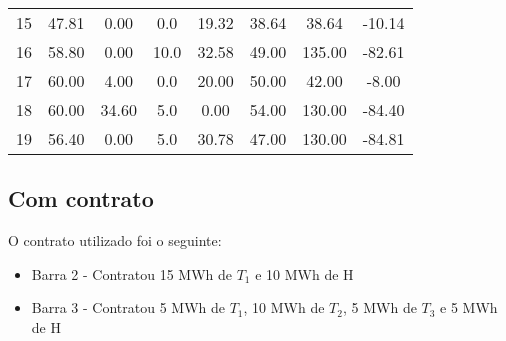 \documentclass[a4paper,12pt,twoside]{article}
\begin{document}
\begin{center}
\begin{tabular}{ c c c c c c c c }
        15   & 47.81     & 0.00      & 0.0  & 19.32   & 38.64   & 38.64  & -10.14 \\
        16   & 58.80     & 0.00     & 10.0  & 32.58   & 49.00  & 135.00  & -82.61 \\
        17   & 60.00     & 4.00      & 0.0  & 20.00   & 50.00   & 42.00   & -8.00 \\
        18   & 60.00    & 34.60      & 5.0   & 0.00   & 54.00  & 130.00  & -84.40 \\
        19   & 56.40     & 0.00      & 5.0  & 30.78   & 47.00  & 130.00  & -84.81
    \end{tabular}
\end{center}

\subsection{Com contrato}
O contrato utilizado foi o seguinte:
\begin{itemize}
    \item{Barra 2 - Contratou 15 MWh de \(T_1\) e 10 MWh de H}
    \item{Barra 3 - Contratou 5 MWh de \(T_1\), 10 MWh de \(T_2\), 5 MWh de \(T_3\) e 5 MWh de H}
\end{itemize}
\end{document}
